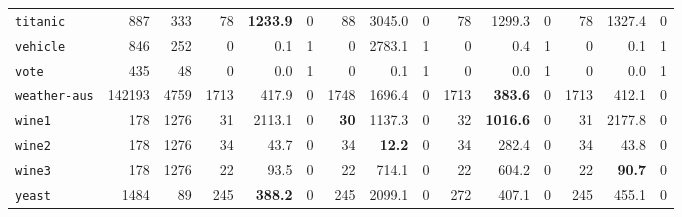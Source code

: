 \begin{tabular}{lccrrrrrrrrrrrr}
\texttt{titanic} & \multicolumn{1}{r}{887} & \multicolumn{1}{r}{333}  & 78 & \textbf{1233.9} & 0 & 88 & 3045.0 & 0 & 78 & 1299.3 & 0 & 78 & 1327.4 & 0\\
\texttt{vehicle} & \multicolumn{1}{r}{846} & \multicolumn{1}{r}{252}  & 0 & 0.1 & 1 & 0 & 2783.1 & 1 & 0 & 0.4 & 1 & 0 & 0.1 & 1\\
\texttt{vote} & \multicolumn{1}{r}{435} & \multicolumn{1}{r}{48}  & 0 & 0.0 & 1 & 0 & 0.1 & 1 & 0 & 0.0 & 1 & 0 & 0.0 & 1\\
\texttt{weather-aus} & \multicolumn{1}{r}{142193} & \multicolumn{1}{r}{4759}  & 1713 & 417.9 & 0 & 1748 & 1696.4 & 0 & 1713 & \textbf{383.6} & 0 & 1713 & 412.1 & 0\\
\texttt{wine1} & \multicolumn{1}{r}{178} & \multicolumn{1}{r}{1276}  & 31 & 2113.1 & 0 & \textbf{30} & 1137.3 & 0 & 32 & \textbf{1016.6} & 0 & 31 & 2177.8 & 0\\
\texttt{wine2} & \multicolumn{1}{r}{178} & \multicolumn{1}{r}{1276}  & 34 & 43.7 & 0 & 34 & \textbf{12.2} & 0 & 34 & 282.4 & 0 & 34 & 43.8 & 0\\
\texttt{wine3} & \multicolumn{1}{r}{178} & \multicolumn{1}{r}{1276}  & 22 & 93.5 & 0 & 22 & 714.1 & 0 & 22 & 604.2 & 0 & 22 & \textbf{90.7} & 0\\
\texttt{yeast} & \multicolumn{1}{r}{1484} & \multicolumn{1}{r}{89}  & 245 & \textbf{388.2} & 0 & 245 & 2099.1 & 0 & 272 & 407.1 & 0 & 245 & 455.1 & 0\\
\bottomrule
\end{tabular}
